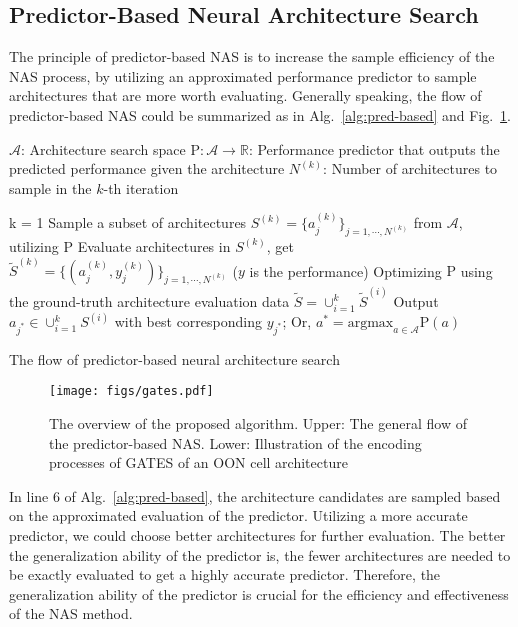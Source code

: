 \documentclass[runningheads]{llncs}
\begin{document}
\subsection{Predictor-Based Neural Architecture Search}
\label{sec:pb-nas}

The principle of predictor-based NAS is to increase the sample efficiency of the NAS process, by utilizing an approximated performance predictor to sample architectures that are more worth evaluating.
Generally speaking, the flow of predictor-based NAS could be summarized as in Alg.~\ref{alg:pred-based} and Fig.~\ref{fig:gates}.

\begin{algorithm}[bt]
\begin{algorithmic}[1]
\STATE $\mathcal{A}$: Architecture search space
\STATE $\mbox{P}: \mathcal{A} \to \mathbb{R}$: Performance predictor that outputs the predicted performance given the architecture
\STATE $N^{(k)}$: Number of architectures to sample in the $k$-th iteration
\item[]
\STATE k = 1
\STATE Sample a subset of architectures $S^{(k)} = \{a_j^{(k)}\}_{j=1,\cdots,N^{(k)}}$ from $\mathcal{A}$, utilizing $\mbox{P}$
\STATE Evaluate architectures in $S^{(k)}$, get $\tilde{S}^{(k)} =  \{(a_j^{(k)}, y_j^{(k)})\}_{j=1,\cdots,N^{(k)}}$ ($y$ is the performance)
\STATE Optimizing $\mbox{P}$ using the ground-truth architecture evaluation data $\tilde{S} = \cup^{k}_{i=1} \tilde{S}^{(i)}$
\ENDWHILE
\STATE Output $a_{j^*} \in \cup^{k}_{i=1} S^{(i)}$ with best corresponding $y_{j^*}$; Or, $a^* = \mbox{argmax}_{a \in \mathcal{A}} \mbox{P}(a)$
\end{algorithmic}
\caption{The flow of predictor-based neural architecture search}
\label{alg:pred-based}
\end{algorithm}


\begin{figure}[tb]
  \begin{center}
    \texttt{[image: figs/gates.pdf]}
    \caption{The overview of the proposed algorithm. Upper: The general flow of the predictor-based NAS. Lower: Illustration of the encoding processes of GATES of an OON cell architecture}
    \label{fig:gates}
  \end{center}

\end{figure}


In line 6 of Alg.~\ref{alg:pred-based}, the architecture candidates are sampled based on the approximated evaluation of the predictor.
Utilizing a more accurate predictor, we could choose better architectures for further evaluation.
The better the generalization ability of the predictor is, the fewer architectures are needed to be exactly evaluated to get a highly accurate
predictor. Therefore, the generalization ability of the predictor is crucial for the efficiency and effectiveness of the NAS method.
\end{document}
